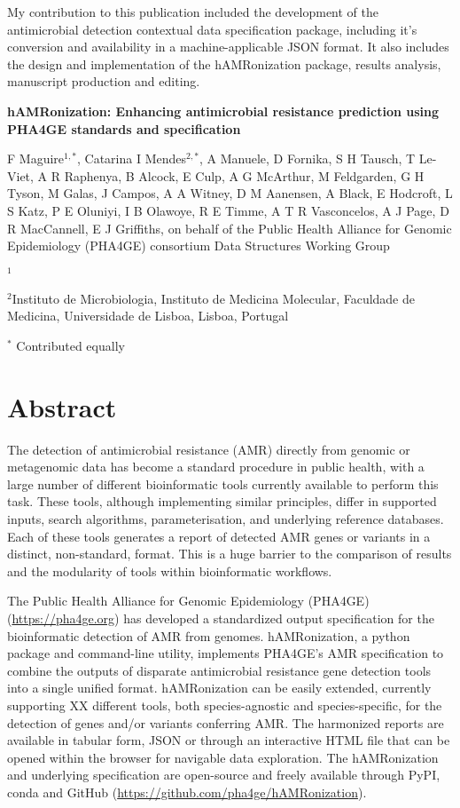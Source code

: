 My contribution to this publication included the development of the antimicrobial detection contextual data specification package, including it’s conversion and availability in a machine-applicable JSON format. It also includes the design and implementation of the hAMRonization package, results analysis, manuscript production and editing. 

\cleardoublepage 

\begin{center}
\large
\textbf{hAMRonization: Enhancing antimicrobial resistance  prediction using PHA4GE standards and specification}
\end{center}

F Maguire$^{1,*}$,
Catarina I Mendes$^{2,*}$, 
A Manuele, 
D Fornika, 
S H Tausch, 
T Le-Viet, 
A R Raphenya, 
B Alcock, 
E Culp, 
A G McArthur, 
M Feldgarden, 
G H Tyson, 
M Galas, 
J Campos, 
A A Witney, 
D M Aanensen, 
A Black, 
E Hodcroft, 
L S Katz, 
P E Oluniyi, 
I B Olawoye, 
R E Timme, 
A T R Vasconcelos, 
A J Page, 
D R MacCannell, 
E J Griffiths, 
on behalf of the Public Health Alliance for Genomic Epidemiology (PHA4GE) consortium Data Structures Working Group

$^1$ 

$^2$Instituto de Microbiologia, Instituto de Medicina Molecular, Faculdade de Medicina, Universidade de Lisboa, Lisboa, Portugal 

$^*$ Contributed equally 

\section{Abstract}

The detection of antimicrobial resistance (AMR) directly from genomic or metagenomic data has become a standard procedure in public health, with a large number of different bioinformatic tools currently available to perform this task. These tools, although implementing similar principles, differ in supported inputs, search algorithms, parameterisation, and underlying reference databases. Each of these tools generates a report of detected AMR genes or variants in a distinct, non-standard, format. This is a huge barrier to the comparison of results and the modularity of tools within bioinformatic workflows. 

The Public Health Alliance for Genomic Epidemiology (PHA4GE) (\url{https://pha4ge.org}) has developed a standardized output specification for the bioinformatic detection of AMR from genomes. hAMRonization, a python package and command-line utility, implements PHA4GE’s AMR specification to combine the outputs of disparate antimicrobial resistance gene detection tools into a single unified format.  hAMRonization can be easily extended, currently supporting XX different  tools, both species-agnostic and species-specific, for the detection of genes and/or variants conferring AMR. The harmonized reports are available in tabular form, JSON or through an interactive HTML file that can be opened within the browser for navigable data exploration. The hAMRonization and underlying specification are open-source and freely available through PyPI, conda and GitHub (\url{https://github.com/pha4ge/hAMRonization}).

